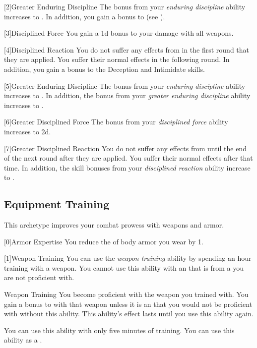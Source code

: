         [2]{Greater Enduring Discipline}
        The bonus from your \textit{enduring discipline} ability increases to .
        In addition, you gain a  bonus to  (see ).

        [3]{Disciplined Force}
        You gain a \plus1d bonus to your damage with all weapons.

        [4]{Disciplined Reaction}
        You do not suffer any effects from  in the first round that they are applied.
        You suffer their normal effects in the following round.
        In addition, you gain a  bonus to the Deception and Intimidate skills.

        [5]{Greater Enduring Discipline}
        The bonus from your \textit{enduring discipline} ability increases to .
        In addition, the bonus from your \textit{greater enduring discipline} ability increases to .

        [6]{Greater Disciplined Force} The bonus from your \textit{disciplined force} ability increases to \plus2d.

        [7]{Greater Disciplined Reaction}
        You do not suffer any effects from  until the end of the next round after they are applied.
        You suffer their normal effects after that time.
        In addition, the skill bonuses from your \textit{disciplined reaction} ability increase to .

    \newpage
    \subsection{Equipment Training}
        This archetype improves your combat prowess with weapons and armor.

        [0]{Armor Expertise} You reduce the  of body armor you wear by 1.

        [1]{Weapon Training} You can use the \textit{weapon training} ability by spending an hour training with a weapon.
        You cannot use this ability with an  that is from a  you are not proficient with.
        \begin{freeability}{Weapon Training}
            You become proficient with the weapon you trained with.
            You gain a  bonus to  with that weapon unless it is an  that you would not be proficient with without this ability.
            This ability's effect lasts until you use this ability again.

            \rankline
             You can use this ability with only five minutes of training.
             You can use this ability as a .
        \end{freeability}


